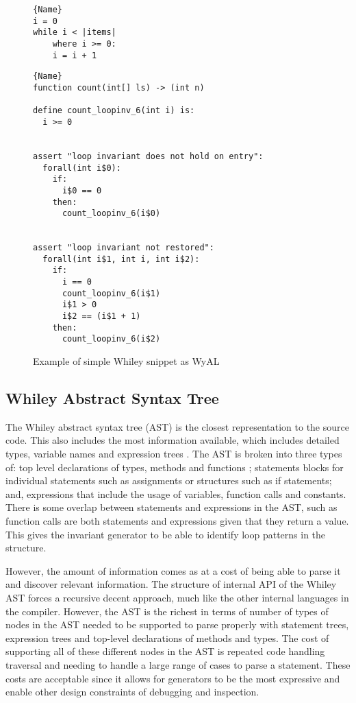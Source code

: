 \begin{figure}
\noindent\begin{minipage}{.45\textwidth}
\begin{lstlisting}[caption={Whiley Code},frame=tlrb,numbers=none]{Name}
i = 0
while i < |items|
    where i >= 0:
    i = i + 1
\end{lstlisting}
\end{minipage}\hfill
\begin{minipage}{.45\textwidth}
\begin{lstlisting}[caption={WyAL Code},frame=tlrb,numbers=none,breaklines=true]{Name}
function count(int[] ls) -> (int n)

define count_loopinv_6(int i) is:
  i >= 0


assert "loop invariant does not hold on entry":
  forall(int i$0):
    if:
      i$0 == 0
    then:
      count_loopinv_6(i$0)


assert "loop invariant not restored":
  forall(int i$1, int i, int i$2):
    if:
      i == 0
      count_loopinv_6(i$1)
      i$1 > 0
      i$2 == (i$1 + 1)
    then:
      count_loopinv_6(i$2)
\end{lstlisting}
\end{minipage}
    \label{lst:design-wyal}
    \caption{Example of simple Whiley snippet as WyAL}
\end{figure}

\subsection{Whiley Abstract Syntax Tree}


The Whiley abstract syntax tree (AST) is the closest representation to
the source code.
This also includes the most information available, which includes detailed
types, variable names and expression trees \cite{whiley-origin}.
The AST is broken into three types of: top level declarations of types,
methods and functions ; statements blocks for individual statements
such as assignments or structures such as if statements; and, expressions
that include the usage of variables, function calls and constants.
There is some overlap between statements and expressions in the AST,
such as function calls are both statements and expressions given that they
return a value.
This gives the invariant generator to be able to identify loop patterns in the
structure.

However, the amount of information comes as at a cost of being able to parse
it and discover relevant information.
The structure of internal API of the Whiley AST forces a recursive decent
approach, much like the other internal languages in the compiler.
However, the AST is the richest in terms of number of types of nodes
in the AST needed to be supported to parse properly with
statement trees, expression trees and top-level declarations of methods and
types.
The cost of supporting all of these different nodes in the AST is
repeated code handling traversal and needing to handle a large range
of cases to parse a statement.
These costs are acceptable since it allows for generators to be
the most expressive and enable other design constraints of
debugging and inspection.

